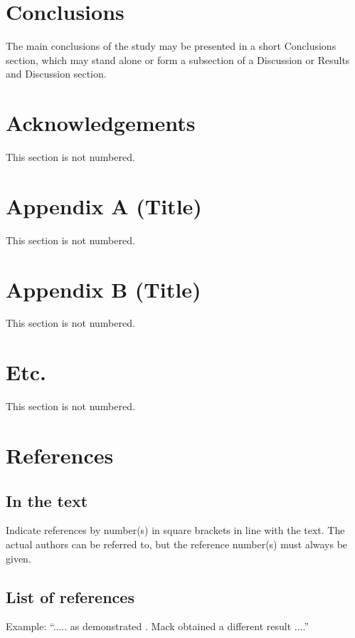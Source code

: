 \documentclass{iac}
\begin{document}
\section{Conclusions}

The main conclusions of the study may be presented in a short Conclusions section, which may stand alone or form a subsection of a Discussion or Results and Discussion section.

\section{Acknowledgements}

This section is not numbered. 

\section*{Appendix A (Title)}

This section is not numbered. 

\section*{Appendix B (Title)}

This section is not numbered. 

\section*{Etc.}

This section is not numbered. 

\section*{References}

\subsection*{In the text}

Indicate references by number(s) in square brackets in line with the text. The actual authors can be referred to, but the reference number(s) must always be given. 

\subsection*{List of references}

Example: “..... as demonstrated \cite{geer2010art,chang2015space,strunk2000elements,mettam2009prepare}. Mack \cite{mack2015virgin} obtained a different result ....”

\printbibliography[heading=none]
\end{document}
